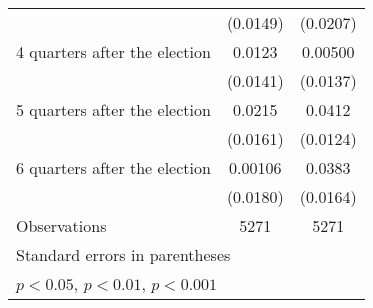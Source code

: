 \begin{table}[htbp]
\begin{tabular}{l*{2}{c}}
                    &    (0.0149)         &    (0.0207)         \\
[1em]
 4 quarters after the election&      0.0123         &     0.00500         \\
                    &    (0.0141)         &    (0.0137)         \\
[1em]
 5 quarters after the election&      0.0215         &      0.0412\sym{***}\\
                    &    (0.0161)         &    (0.0124)         \\
[1em]
 6 quarters after the election&     0.00106         &      0.0383\sym{*}  \\
                    &    (0.0180)         &    (0.0164)         \\
\hline
Observations        &        5271         &        5271         \\
\hline\hline
\multicolumn{3}{l}{\footnotesize Standard errors in parentheses}\\
\multicolumn{3}{l}{\footnotesize \sym{*} \(p<0.05\), \sym{**} \(p<0.01\), \sym{***} \(p<0.001\)}\\
\end{tabular}
\end{table}
